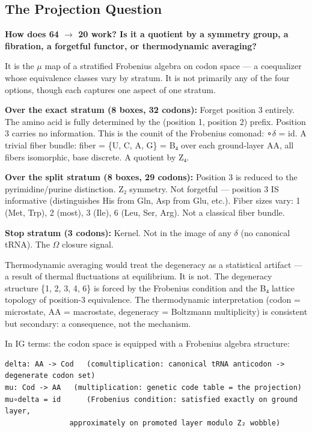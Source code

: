 \documentclass[12pt,a4paper]{article}
\begin{document}
\subsection{The Projection Question}

\textbf{How does 64 $\rightarrow$ 20 work? Is it a quotient by a symmetry group, a fibration, a forgetful functor, or thermodynamic averaging?}

It is the $\mu$ map of a stratified Frobenius algebra on codon space --- a coequalizer whose equivalence classes vary by stratum. It is not primarily any of the four options, though each captures one aspect of one stratum.

\textbf{Over the exact stratum (8 boxes, 32 codons):} Forget position 3 entirely. The amino acid is fully determined by the (position 1, position 2) prefix. Position 3 carries no information. This is the counit of the Frobenius comonad: \epsilon∘$\delta$ = id. A trivial fiber bundle: fiber = \{U, C, A, G\} = B₄ over each ground-layer AA, all fibers isomorphic, base discrete. A quotient by Z₄.

\textbf{Over the split stratum (8 boxes, 29 codons):} Position 3 is reduced to the pyrimidine/purine distinction. Z₂ symmetry. Not forgetful --- position 3 IS informative (distinguishes His from Gln, Asp from Glu, etc.). Fiber sizes vary: 1 (Met, Trp), 2 (most), 3 (Ile), 6 (Leu, Ser, Arg). Not a classical fiber bundle.

\textbf{Stop stratum (3 codons):} Kernel. Not in the image of any $\delta$ (no canonical tRNA). The $\Omega$ closure signal.

Thermodynamic averaging would treat the degeneracy as a statistical artifact --- a result of thermal fluctuations at equilibrium. It is not. The degeneracy structure \{1, 2, 3, 4, 6\} is forced by the Frobenius condition and the B₄ lattice topology of position-3 equivalence. The thermodynamic interpretation (codon = microstate, AA = macrostate, degeneracy = Boltzmann multiplicity) is consistent but secondary: a consequence, not the mechanism.

In IG terms: the codon space is equipped with a Frobenius algebra structure:

\begin{lstlisting}
delta: AA -> Cod   (comultiplication: canonical tRNA anticodon -> degenerate codon set)
mu: Cod -> AA   (multiplication: genetic code table = the projection)
mu∘delta = id      (Frobenius condition: satisfied exactly on ground layer,
               approximately on promoted layer modulo Z₂ wobble)
\end{lstlisting}
\end{document}
